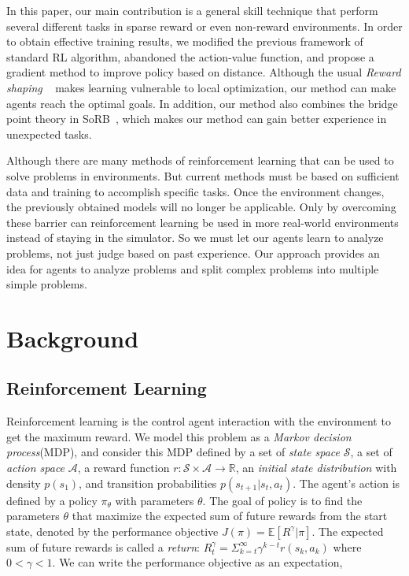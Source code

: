\documentclass[8pt,twoside,a4paper]{article}
\begin{document}
\par In this paper, our main contribution is a general skill technique that perform several different tasks in sparse reward or even non-reward environments. In order to obtain effective training results, we modified the previous framework of standard RL algorithm, abandoned the action-value function, and propose a gradient method to improve policy based on distance. Although the usual \emph{Reward shaping} ~\cite{mataric1994reward,ng1999policy} makes learning vulnerable to local optimization, our method can make agents reach the optimal goals. In addition, our method also combines the bridge point theory in SoRB~\cite{eysenbach2019search}, which makes our method can gain better experience in unexpected tasks.

\par Although there are many methods of reinforcement learning that can be used to solve problems in environments. But current methods must be based on sufficient data and training to accomplish specific tasks. Once the environment changes, the previously obtained models will no longer be applicable. Only by overcoming these barrier can reinforcement learning be used in more real-world environments instead of staying in the simulator. So we must let our agents learn to analyze problems, not just judge based on past experience. Our approach provides an idea for agents to analyze problems and split complex problems into multiple simple problems. 




\section{Background}
\subsection{Reinforcement Learning}
Reinforcement learning is the control agent interaction with the environment to get the maximum reward. We model this problem as a \emph{Markov decision process}(MDP), and consider this MDP defined by a set of \emph{state space} $\mathcal{S}$, a set of \emph{action space} $\mathcal{A}$, a reward function $r:\mathcal{S}\times\mathcal{A}\rightarrow \mathbb{R}$, an \emph{initial state distribution} with density $p(s_{1})$, and transition probabilities $p(s_{t+1}|s_{t},a_{t})$. The agent's action is defined by a policy $\pi_{\theta}$ with parameters $\theta$. The goal of policy is to find the parameters $\theta$ that maximize the expected sum of future rewards from the start state, denoted by the performance objective $J(\pi)=\mathbb{E}[R^{\gamma}|\pi]$. The expected sum of future rewards is called a \emph{return}: $R_{t}^{\gamma}=\Sigma_{k=t}^{\infty}\gamma^{k-t}r(s_{k},a_{k})$ where $0<\gamma<1$. We can write the performance objective as an expectation,
\end{document}
